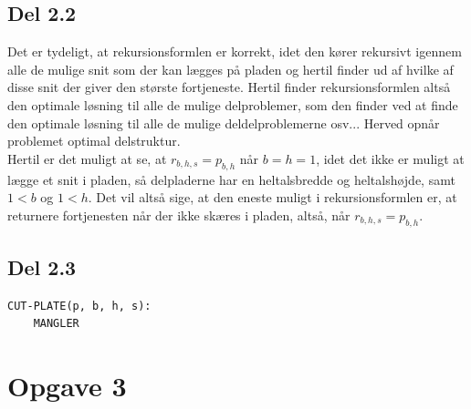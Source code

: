 \documentclass{report}
\begin{document}
\newpage

\subsection*{Del 2.2}
Det er tydeligt, at rekursionsformlen er korrekt, idet den kører rekursivt igennem alle de mulige snit som der kan lægges på pladen og hertil finder ud af hvilke af disse snit der giver den største fortjeneste. Hertil finder rekursionsformlen altså den optimale løsning til alle de mulige delproblemer, som den finder ved at finde den optimale løsning til alle de mulige deldelproblemerne osv... Herved opnår problemet optimal delstruktur. \\
Hertil er det muligt at se, at $r_{b, h, s} = p_{b, h}$ når $b = h = 1$, idet det ikke er muligt at lægge et snit i pladen, så delpladerne har en heltalsbredde og heltalshøjde, samt $1 < b$ og $1 < h$. Det vil altså sige, at den eneste muligt i rekursionsformlen er, at returnere fortjenesten når der ikke skæres i pladen, altså, når $r_{b, h, s} = p_{b, h}$.

\newpage

\subsection*{Del 2.3}
\begin{verbatim}
CUT-PLATE(p, b, h, s):
    MANGLER
\end{verbatim}

\newpage


\section*{Opgave 3}
\end{document}
